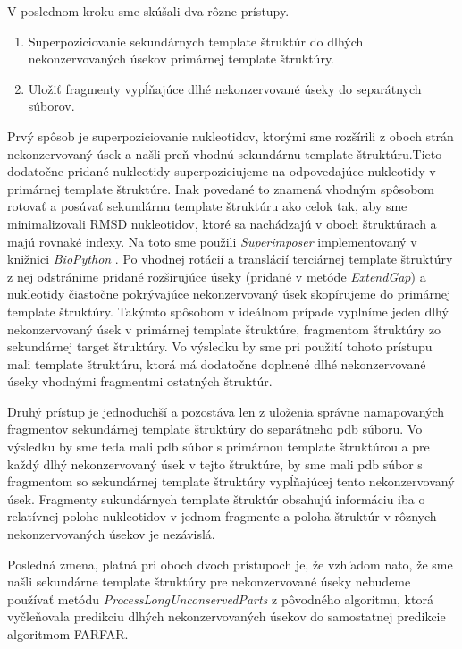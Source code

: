 \indent V poslednom kroku sme skúšali dva rôzne prístupy. 
\begin{enumerate}
\item Superpoziciovanie sekundárnych template štruktúr do dlhých nekonzervovaných úsekov primárnej template štruktúry.
\item Uložiť fragmenty vypĺňajúce dlhé nekonzervované úseky do separátnych súborov.
\end{enumerate}

\indent Prvý spôsob je superpoziciovanie nukleotidov, ktorými sme rozšírili z oboch strán nekonzervovaný úsek a našli preň vhodnú sekundárnu template štruktúru.Tieto dodatočne pridané nukleotidy superpoziciujeme na odpovedajúce nukleotidy v primárnej template štruktúre. Inak povedané to znamená vhodným spôsobom rotovať a posúvať sekundárnu template štruktúru ako celok tak, aby sme minimalizovali RMSD nukleotidov, ktoré sa nachádzajú v oboch štruktúrach a majú rovnaké indexy. Na toto sme použili \textit{Superimposer} implementovaný v knižnici \textit{BioPython} \cite{BioPython}. Po vhodnej rotácií a translácií terciárnej template štruktúry z nej odstránime pridané rozširujúce úseky (pridané v metóde \textit{ExtendGap}) a nukleotidy čiastočne pokrývajúce nekonzervovaný úsek skopírujeme do primárnej template štruktúry. Takýmto spôsobom v ideálnom prípade vyplníme jeden dlhý nekonzervovaný úsek v primárnej template štruktúre, fragmentom štruktúry zo sekundárnej target štruktúry. Vo výsledku by sme pri použití tohoto prístupu mali template štruktúru, ktorá má dodatočne doplnené dlhé nekonzervované úseky vhodnými fragmentmi ostatných štruktúr. 


\indent Druhý prístup je jednoduchší a pozostáva len z uloženia správne namapovaných fragmentov sekundárnej template štruktúry do separátneho pdb súboru. Vo výsledku by sme teda mali pdb súbor s primárnou template štruktúrou a pre každý dlhý nekonzervovaný úsek v tejto štruktúre, by sme mali pdb súbor s fragmentom so sekundárnej template štruktúry vypĺňajúcej tento nekonzervovaný úsek. Fragmenty sukundárnych template štruktúr obsahujú informáciu iba o  relatívnej polohe nukleotidov v jednom fragmente a poloha štruktúr v rôznych nekonzervovaných úsekov je nezávislá.


\indent Posledná zmena, platná pri oboch dvoch prístupoch je, že vzhľadom nato, že sme našli sekundárne template štruktúry pre nekonzervované úseky nebudeme používať metódu \textit{ProcessLongUnconservedParts} z pôvodného algoritmu, ktorá vyčleňovala predikciu dlhých nekonzervovaných úsekov do samostatnej predikcie algoritmom FARFAR.



